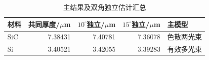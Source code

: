 \begin{table}[htbp]\centering
\caption{主结果及双角独立估计汇总}\label{tab:answer-summary}
\begin{tabular}{lrrrl}
\toprule
材料 & 共同厚度/$\mu$m & $10^\circ$独立/$\mu$m & $15^\circ$独立/$\mu$m & 主模型\\\midrule
SiC & 7.38431 & 7.40781 & 7.36078 & 色散两光束\\
Si & 3.40521 & 3.42055 & 3.39283 & 有效多光束\\
\bottomrule
\end{tabular}\end{table}
